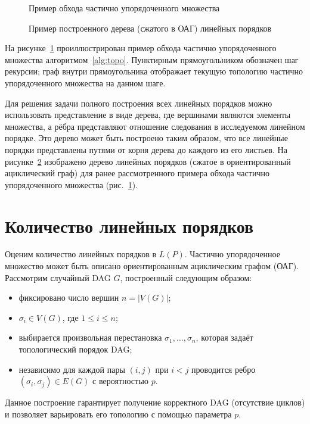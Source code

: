\begin{figure}[htbp]
  \centerfloat{
    
  }
  \caption{Пример обхода частично упорядоченного множества}
  \label{fig:topo-trav}
\end{figure}

\begin{figure}[htbp]
  \centerfloat{
    
  }
  \caption{Пример построенного дерева (сжатого в ОАГ) линейных порядков}
  \label{fig:topo-trav-tree}
\end{figure}

На рисунке~\ref{fig:topo-trav} проиллюстрирован пример обхода
частично упорядоченного множества алгоритмом~\ref{alg:topo}.
Пунктирным прямоугольником обозначен шаг рекурсии; граф внутри
прямоугольника отображает текущую топологию частично упорядоченного
множества на данном шаге.

Для решения задачи полного построения всех линейных порядков можно
использовать представление в виде дерева, где вершинами являются
элементы множества, а рёбра представляют отношение следования в
исследуемом линейном порядке. Это дерево может быть построено таким
образом, что все линейные порядки представлены путями от корня дерева
до каждого из его листьев. На рисунке~\cref{fig:topo-trav-tree}
изображено дерево линейных порядков (сжатое в ориентированный
ациклический граф) для ранее рассмотренного примера обхода частично
упорядоченного множества (рис.~\cref{fig:topo-trav}).

\section{Количество линейных порядков}
\label{sec:ch2/linext-count}

Оценим количество линейных порядков в $L(P)$.
Частично упорядоченное множество может быть описано
ориентированным ациклическим графом (ОАГ). Рассмотрим случайный DAG
$G$, построенный следующим образом:
\begin{itemize}
  \item фиксировано число вершин $n = |V(G)|$;
  \item $\sigma_i \in V(G)$, где $1 \leq i \leq n$;
  \item выбирается произвольная перестановка $\sigma_1, \dots,
    \sigma_n$, которая задаёт топологический порядок DAG;
  \item независимо для каждой пары $(i, j)$ при $i < j$ проводится
    ребро $(\sigma_i, \sigma_j) \in E(G)$ с вероятностью $p$.
\end{itemize}
Данное построение гарантирует получение корректного DAG (отсутствие
циклов) и позволяет варьировать его топологию с помощью параметра $p$.

